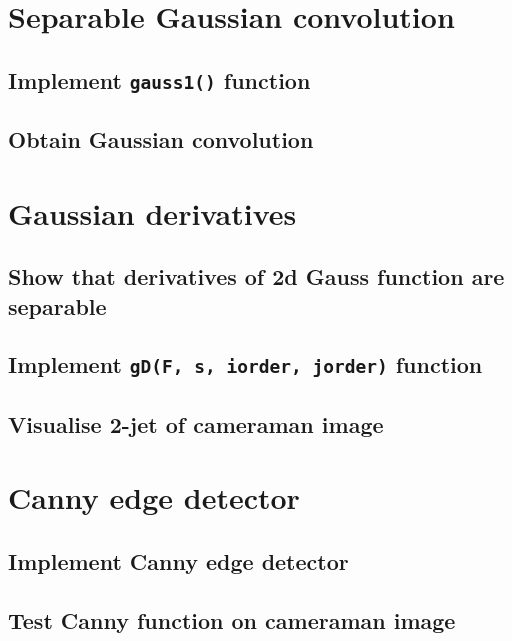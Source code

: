 \documentclass[abstract=true]{scrartcl}
\begin{document}
\section{Separable Gaussian convolution}

    \subsection{Implement \texttt{gauss1()} function}

    \subsection{Obtain Gaussian convolution}


\section{Gaussian derivatives}

    \subsection{Show that derivatives of 2d Gauss function are separable}

    \subsection{Implement \texttt{gD(F, s, iorder, jorder)} function}

    \subsection{Visualise 2-jet of cameraman image}



\section{Canny edge detector}

    \subsection{Implement Canny edge detector}

    \subsection{Test Canny function on cameraman image}
\end{document}
